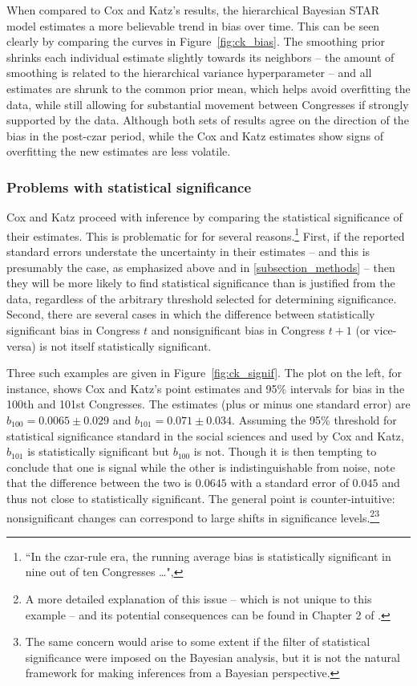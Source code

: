 When compared to Cox and Katz's results, the hierarchical Bayesian STAR model estimates 
a more believable trend in bias over time. This can be seen clearly by comparing the curves 
in Figure~\ref{fig:ck_bias}. The smoothing prior shrinks each individual estimate slightly 
towards its neighbors -- the amount of smoothing is related to the hierarchical variance 
hyperparameter -- and all estimates are shrunk to the common prior mean, which helps 
avoid overfitting the data, while still allowing for substantial movement between Congresses 
if strongly supported by the data. Although both sets of results agree on the direction of the 
bias in the post-czar period, while the Cox and Katz estimates show signs of overfitting 
the new estimates are less volatile. 


\subsubsection{Problems with statistical significance}

Cox and Katz proceed with inference by comparing the statistical significance of their 
estimates. This is problematic for for several reasons.\footnote{``In the czar-rule era, 
the running average bias is statistically significant in nine out of ten Congresses \dots", } 
First, if the reported standard errors understate the uncertainty in their estimates 
-- and this is presumably the case, as emphasized above and in \ref{subsection_methods} 
-- then they will be more likely to find statistical significance than is justified from the data, 
regardless of the arbitrary threshold selected for determining significance. Second, there
are several cases in which the difference between statistically significant 
bias in Congress $t$ and nonsignificant bias in Congress $t + 1$ (or vice-versa) is not itself 
statistically significant. 

Three such examples are given in Figure~\ref{fig:ck_signif}. The plot on the left, for instance, 
shows Cox and Katz's point estimates and 95\% intervals for bias in the 100th and 101st 
Congresses. The estimates (plus or minus one standard error) are $b_{100} = 0.0065 \pm 0.029$ 
and $b_{101} = 0.071 \pm 0.034$. Assuming the 95\% threshold for statistical significance 
standard in the social sciences and used by Cox and Katz, $b_{101}$ is statistically significant 
but $b_{100}$ is not. Though it is then tempting to conclude that one is signal while the other 
is indistinguishable from noise, note that the difference between the two is 
$0.0645$ with a standard error of $0.045$ and thus not close to statistically significant. 
The general point is counter-intuitive: nonsignificant changes can correspond to large shifts 
in significance levels.\footnote{A more detailed explanation of this issue -- which is not unique to this 
example -- and its potential consequences can be found in Chapter 2 of 
.}\footnote{The same concern would arise to some extent if the filter 
of statistical significance were imposed on the Bayesian analysis, but it is not the natural framework 
for making inferences from a Bayesian perspective.} 


